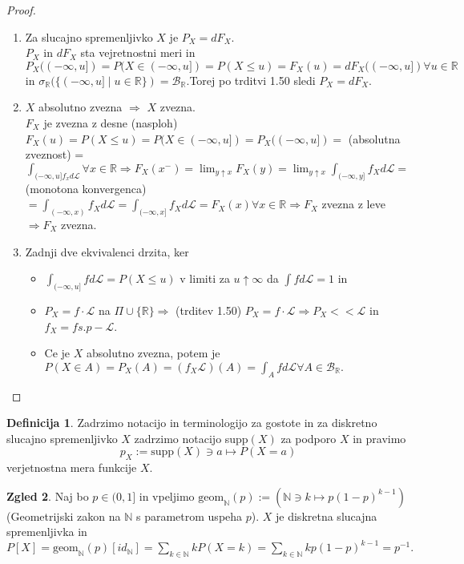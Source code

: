 \documentclass[a4paper,12pt]{article}
\theoremstyle{definition} %
\newtheorem{definicija}{Definicija}[section]
\newtheorem{zgled}[definicija]{Zgled}
\theoremstyle{plain} %
\newcommand{\R}{\mathbb{R}}
\newcommand{\N}{\mathbb{N}}
\newcommand{\B}{\mathcal{B}}
\newcommand{\Le}{\mathcal{L}}
\begin{document}
        \begin{proof}
            \begin{enumerate}
                \item Za slucajno spremenljivko $X$ je $P_X = dF_X$. \\
                 $P_X$ in $dF_X$ sta vejretnostni meri in $P_X((-\infty, u]) = P(X \in (-\infty, u]) = P(X \leq u) = F_X(u) = dF_X((-\infty, u]) \forall u \in \R$ in $\sigma_\R(\{(-\infty, u] \mid u \in \R\}) = \B_\R$.Torej po trditvi 1.50 sledi $P_X = dF_X$.
                
                \item $X$ absolutno zvezna $\Rightarrow$ $X$ zvezna. \\
                $F_X$ je zvezna z desne (nasploh) \\
                $F_X(u) = P(X \leq u) = P(X \in (-\infty, u]) = P_X((-\infty, u]) =$ (absolutna zveznost) = $\int_{(-\infty, u]f_xd\Le} \forall x \in \R \Rightarrow F_X(x^-) = \lim_{y\uparrow x}F_X(y) = \lim_{y\uparrow x}\int_{(-\infty, y]}f_Xd\Le =$ (monotona konvergenca) $= \int_{(-\infty, x)}f_Xd\Le = \int_{(-\infty, x]}f_Xd\Le = F_X(x) \forall x \in \R \Rightarrow F_X$ zvezna z leve$ \Rightarrow F_X$ zvezna.

                \item Zadnji dve ekvivalenci drzita, ker \\
                \begin{itemize}
                    \item $\int_{(-\infty, u]}fd\Le = P(X \leq u)$ v limiti za $u \uparrow \infty$ da $\int fd\Le = 1$ in 
                    \item $P_X = f \cdot \Le$ na $\Pi \cup \{\R\} \Rightarrow$ (trditev 1.50) $P_X = f \cdot \Le \Rightarrow P_X << \Le$ in $f_X = f s.p-\Le$.
                    \item Ce je $X$ absolutno zvezna, potem je $P(X\in A) = P_X(A) = (f_X\Le)(A) = \int_Afd\Le \forall A \in \B_\R.$
                \end{itemize}

                      
            \end{enumerate}
        \end{proof}

        \begin{definicija}
            Zadrzimo notacijo in terminologijo za gostote in za diskretno slucajno spremenljivko $X$ zadrzimo notacijo supp$(X)$ za podporo $X$ in pravimo 
            $$
                p_X := \text{supp}(X)\ni a \mapsto P(X = a)
            $$
            verjetnostna mera funkcije $X$.
        \end{definicija}

        \begin{zgled}
            Naj bo $p \in (0, 1]$ in vpeljimo $\text{geom}_\N(p):= (\N \ni k \mapsto p(1-p)^{k-1})$ (Geometrijski zakon na $\N$ s parametrom uspeha $p$). $X$ je diskretna slucajna spremenljivka in $P[X] = \text{geom}_\N(p)[id_\N] = \sum_{k\in\N}kP(X=k) = \sum_{k\in\N}kp(1-p)^{k-1} = p^{-1}.$
        \end{zgled}
\end{document}
